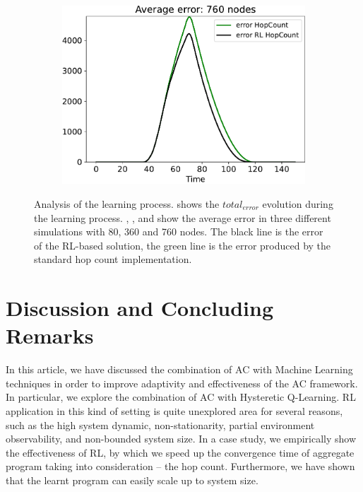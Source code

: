 \documentclass[conference]{IEEEtran}
\newcommand{\todos}[1]{\todo[inline, color=cyan]{\textbf{TODO}: #1}}
\begin{document}
\begin{figure}
\begin{subfigure}[b]{0.3\textwidth}
      \includegraphics[width=\textwidth]{img/760}
      \caption{}
      \label{fig:simulation-d}
  \end{subfigure}
  \caption{Analysis of the learning process.  shows the $total_{error}$ evolution during the learning process. , , and  show the average error in three different simulations with 80, 360 and 760 nodes. 
  The black line is the error of the RL-based solution, 
  the green line is the error produced by the standard hop count implementation.}
  \label{fig:simulation}
\end{figure}

\section{Discussion and Concluding Remarks}\label{conclusion}
In this article, we have discussed the combination of AC with Machine Learning techniques in order to improve adaptivity
 and effectiveness of the AC framework.
%
In particular, we explore the combination of AC with Hysteretic Q-Learning.
%
RL application in this kind of setting is quite unexplored %
 area for several reasons, such as the high system dynamic, non-stationarity,  partial environment observability, and non-bounded system size.
In a case study, we empirically show the effectiveness of RL, by which we speed up the convergence time of
 aggregate program taking into consideration -- the hop count.
Furthermore, we have shown that the learnt program can easily scale up to system size.
\end{document}
